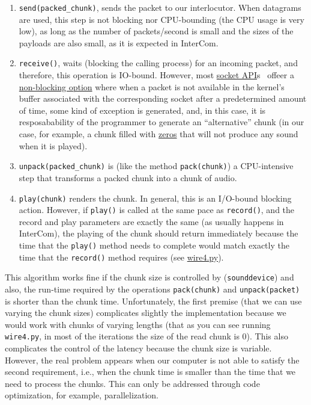 \begin{enumerate}
\item \verb|send(packed_chunk)|, sends the packet to our
  interlocutor. When datagrams are used, this step is not blocking nor
  CPU-bounding (the CPU usage is very low), as long as the number of
  packets/second is small and the sizes of the payloads are also
  small, as it is expected in InterCom.

\item \verb|receive()|, waits (blocking the calling process) for an
  incoming packet, and therefore, this operation is IO-bound. However,
  most \href{https://docs.python.org/3/library/socket.html}{socket
    API}s~\cite{python} offeer a
  \href{https://docs.python.org/3.8/library/socket.html#socket.socket.setblocking}{non-blocking
    option} where when a packet is not available in the kernel's
  buffer associated with the corresponding socket after a
  predetermined amount of time, some kind of exception is generated,
  and, in this case, it is resposabability of the programmer to
  generate an ``alternative'' chunk (in our case, for example, a chunk
  filled with
  \href{https://en.wikipedia.org/wiki/Digital_audio#Overview}{zeros}
  that will not produce any sound when it is played).

\item \verb|unpack(packed_chunk)| is (like the method
  \texttt{pack(chunk)}) a CPU-intensive step that transforms a
  packed chunk into a chunk of audio.

\item \verb|play(chunk)| renders the chunk. In general, this is an
  I/O-bound blocking action. However, if \verb|play()| is called at
  the same pace as \verb|record()|, and the record and play parameters
  are exactly the same (as usually happens in InterCom), the playing of
  the chunk should return immediately because the time that the
  \verb|play()| method needs to complete would match exactly the time
  that the \verb|record()| method requires (see
  \href{https://github.com/Tecnologias-multimedia/InterCom/blob/master/test/sounddevice/wire4.py}{wire4.py}).
\end{enumerate}

This algorithm works fine if the chunk size is controlled by
(\verb|sounddevice|) and also, the run-time required by the operations
\verb|pack(chunk)| and \verb|unpack(packet)| is shorter than the chunk
time. Unfortunately, the first premise (that we can use varying the
chunk sizes) complicates slightly the implementation because we would
work with chunks of varying lengths (that as you can see running
\verb|wire4.py|, in most of the iterations the size of the read chunk
is 0). This also complicates the control of the latency because the
chunk size is variable. However, the real problem appears when our
computer is not able to satisfy the second requirement, i.e., when the
chunk time is smaller than the time that we need to process the
chunks. This can only be addressed through code optimization, for
example, parallelization.

